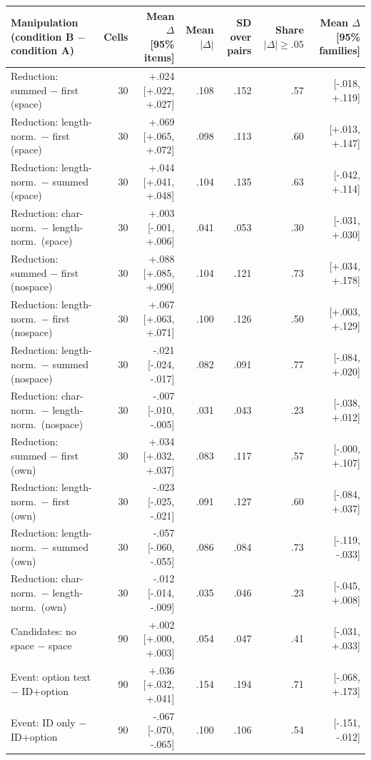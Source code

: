 \begin{table}[t]
\centering\scriptsize
\setlength{\tabcolsep}{4pt}
\begin{tabular}{@{}lrrrrrr@{}}
\toprule
Manipulation (condition B $-$ condition A) & Cells & Mean $\Delta$ [95\% items] & Mean $|\Delta|$ & SD over pairs & Share $|\Delta|\ge.05$ & Mean $\Delta$ [95\% families] \\
\midrule
Reduction: summed $-$ first (space) & 30 & +.024 [+.022, +.027] & .108 & .152 & .57 & [-.018, +.119] \\
Reduction: length-norm.\ $-$ first (space) & 30 & +.069 [+.065, +.072] & .098 & .113 & .60 & [+.013, +.147] \\
Reduction: length-norm.\ $-$ summed (space) & 30 & +.044 [+.041, +.048] & .104 & .135 & .63 & [-.042, +.114] \\
Reduction: char-norm.\ $-$ length-norm.\ (space) & 30 & +.003 [-.001, +.006] & .041 & .053 & .30 & [-.031, +.030] \\
Reduction: summed $-$ first (nospace) & 30 & +.088 [+.085, +.090] & .104 & .121 & .73 & [+.034, +.178] \\
Reduction: length-norm.\ $-$ first (nospace) & 30 & +.067 [+.063, +.071] & .100 & .126 & .50 & [+.003, +.129] \\
Reduction: length-norm.\ $-$ summed (nospace) & 30 & -.021 [-.024, -.017] & .082 & .091 & .77 & [-.084, +.020] \\
Reduction: char-norm.\ $-$ length-norm.\ (nospace) & 30 & -.007 [-.010, -.005] & .031 & .043 & .23 & [-.038, +.012] \\
Reduction: summed $-$ first (own) & 30 & +.034 [+.032, +.037] & .083 & .117 & .57 & [-.000, +.107] \\
Reduction: length-norm.\ $-$ first (own) & 30 & -.023 [-.025, -.021] & .091 & .127 & .60 & [-.084, +.037] \\
Reduction: length-norm.\ $-$ summed (own) & 30 & -.057 [-.060, -.055] & .086 & .084 & .73 & [-.119, -.033] \\
Reduction: char-norm.\ $-$ length-norm.\ (own) & 30 & -.012 [-.014, -.009] & .035 & .046 & .23 & [-.045, +.008] \\
Candidates: no space $-$ space & 90 & +.002 [+.000, +.003] & .054 & .047 & .41 & [-.031, +.033] \\
Event: option text $-$ ID+option & 90 & +.036 [+.032, +.041] & .154 & .194 & .71 & [-.068, +.173] \\
Event: ID only $-$ ID+option & 90 & -.067 [-.070, -.065] & .100 & .106 & .54 & [-.151, -.012] \\

\end{tabular}
\end{table}
